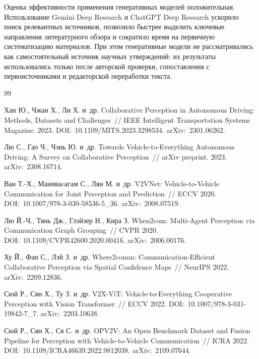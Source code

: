 \documentclass[14pt,a4paper]{extreport}
\begin{document}
Оценка эффективности применения генеративных моделей положительная. Использование Gemini Deep Research и ChatGPT Deep Research ускорило поиск релевантных источников, позволило быстрее выделить ключевые направления литературного обзора и сократило время на первичную систематизацию материалов. При этом генеративные модели не рассматривались как самостоятельный источник научных утверждений: их результаты использовались только после авторской проверки, сопоставления с первоисточниками и редакторской переработки текста.

\renewcommand{\bibname}{БИБЛИОГРАФИЧЕСКИЙ СПИСОК}
\begin{thebibliography}{99}

Хан Ю., Чжан Х., Ли Х. и~др. Collaborative Perception in Autonomous Driving: Methods, Datasets and Challenges~// IEEE Intelligent Transportation Systems Magazine. 2023. DOI:~10.1109/MITS.2023.3298534. arXiv:~2301.06262.

Лю С., Гао Ч., Чэнь Ю. и~др. Towards Vehicle-to-Everything Autonomous Driving: A Survey on Collaborative Perception~// arXiv preprint. 2023. arXiv:~2308.16714.

Ван Т.-Х., Маниваcагам С., Лян М. и~др. V2VNet: Vehicle-to-Vehicle Communication for Joint Perception and Prediction~// ECCV 2020. DOI:~10.1007/978-3-030-58536-5\_36. arXiv:~2008.07519.

Лю Й.-Ч., Тянь Дж., Глэйзер Н., Кира З. When2com: Multi-Agent Perception via Communication Graph Grouping~// CVPR 2020. DOI:~10.1109/CVPR42600.2020.00416. arXiv:~2006.00176.

Ху Й., Фан С., Лэй З. и~др. Where2comm: Communication-Efficient Collaborative Perception via Spatial Confidence Maps~// NeurIPS 2022. arXiv:~2209.12836.

Сюй Р., Сян Х., Ту З. и~др. V2X-ViT: Vehicle-to-Everything Cooperative Perception with Vision Transformer~// ECCV 2022. DOI:~10.1007/978-3-031-19842-7\_7. arXiv:~2203.10638.

Сюй Р., Сян Х., Ся С. и~др. OPV2V: An Open Benchmark Dataset and Fusion Pipeline for Perception with Vehicle-to-Vehicle Communication~// ICRA 2022. DOI:~10.1109/ICRA46639.2022.9812038. arXiv:~2109.07644.


\end{thebibliography}
\end{document}
